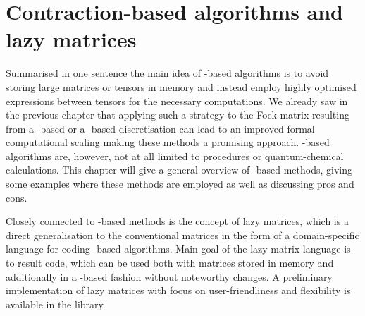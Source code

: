 \chapter{Contraction-based algorithms and lazy matrices}
\label{ch:LazyMatrices}
%
%

\noindent
Summarised in one sentence the main idea of \contraction-based algorithms
is to avoid storing large matrices or tensors in memory
and instead employ highly optimised
\contraction expressions between tensors for the necessary computations.
We already saw in the previous chapter that applying
such a strategy to the Fock matrix resulting from a \FE-based
or a \CS-based discretisation
can lead to an improved formal computational scaling
making these methods a promising approach.
\contraction-based algorithms are, however,
not at all limited to \SCF procedures or quantum-chemical calculations.
This chapter will give a general overview
of \contraction-based methods,
giving some examples where these methods are employed
as well as discussing pros and cons.

Closely connected to \contraction-based methods is the concept of lazy matrices,
which is a direct generalisation to the conventional matrices
in the form of a domain-specific language
for coding \contraction-based algorithms.
Main goal of the lazy matrix language is to result code,
which can be used both with matrices stored in memory
and additionally in a \contraction-based fashion without noteworthy changes.
A preliminary \cpp implementation of lazy matrices
with focus on user-friendliness and flexibility
is available in the \lazyten library.



